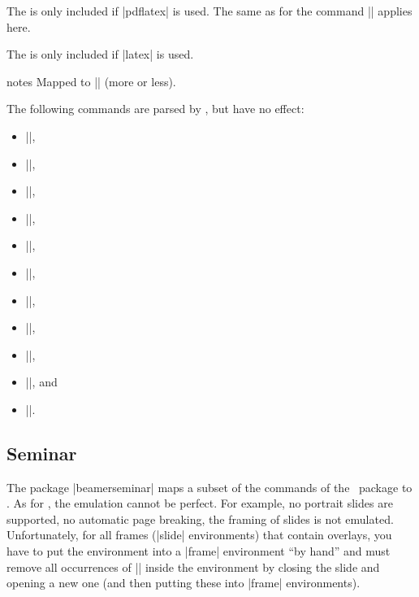\begin{command}{\onlyInPDF{}}
  The  is only included if |pdflatex| is used. The same as for the command |\PDForPS| applies here.
\end{command}

\begin{command}{\onlyInPS{}}
  The  is only included if |latex| is used.
\end{command}

\begin{environment}{{notes}}
  Mapped to || (more or less).
\end{environment}

The following commands are parsed by \beamer, but have no effect:
\begin{itemize}\itemsep=0pt\parskip=0pt
\item |\myitem|,
\item |\FontTitle|,
\item |\FontText|,
\item |\ColorFoot|,
\item |\DefaultTransition|,
\item |\NoFrenchBabelItemize|,
\item |\TitleSlideNav|,
\item |\NormalSlideNav|,
\item |\HAPsetup|,
\item |\LeftFoot|, and
\item |\RightFoot|.
\end{itemize}


\subsection{Seminar}
\label{section-seminar}

The package |beamerseminar| maps a subset of the commands of the \seminar\ package to \beamer. As for \prosper, the emulation cannot be perfect. For example, no portrait slides are supported, no automatic page breaking, the framing of slides is not emulated. Unfortunately, for all frames (|slide| environments) that contain overlays, you have to put the environment into a |frame| environment ``by hand'' and must remove all occurrences of |\newslide| inside the environment by closing the slide and opening a new one (and then putting these into |frame| environments).

